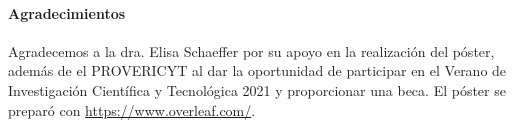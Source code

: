 \documentclass[a4]{sciposter}
\begin{document}
\begin{multicols}{2}
\paragraph{Agradecimientos}

{\small Agradecemos a la dra. Elisa Schaeffer por su apoyo en la realización del póster, además de el PROVERICYT al dar la oportunidad de participar en el Verano de Investigación Científica y Tecnológica 2021 y proporcionar una beca.
El póster se preparó con \url{https://www.overleaf.com/}.}





\end{multicols}
\end{document}
